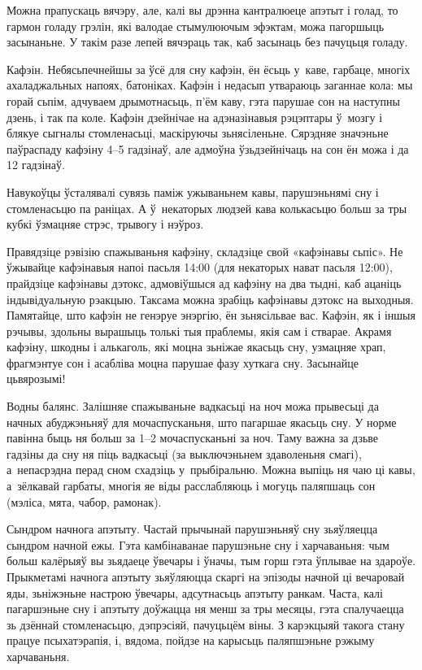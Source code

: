Можна прапускаць вячэру, але, калі вы дрэнна кантралюеце апэтыт і голад, то гармон голаду грэлін, які валодае стымулюючым эфэктам, можа пагоршыць засынаньне. У такім разе лепей вячэраць так, каб засынаць без пачуцьця голаду.

Кафэін. Небясьпечнейшы за ўсё для сну кафэін, ён ёсьць у~каве, гарбаце, многіх ахаладжальных напоях, батоніках. Кафэін і недасып утвараюць заганнае кола: мы горай сьпім, адчуваем дрымотнасьць, п'ём каву, гэта парушае сон на наступны дзень, і так па коле. Кафэін дзейнічае на адэназінавыя рэцэптары ў~мозгу і блякуе сыгналы стомленасьці, маскіруючы зьнясіленьне. Сярэдняе значэньне паўраспаду кафэіну 4--5 гадзінаў, але адмоўна ўзьдзейнічаць на сон ён можа і да 12 гадзінаў.

Навукоўцы ўсталявалі сувязь паміж ужываньнем кавы, парушэньнямі сну і стомленасьцю па раніцах. А ў~некаторых людзей кава колькасьцю больш за тры кубкі ўзмацняе стрэс, трывогу і нэўроз.

Правядзіце рэвізію спажываньня кафэіну, складзіце свой «кафэінавы сьпіс». Не ўжывайце кафэінавыя напоі пасьля 14:00 (для некаторых нават пасьля 12:00), прайдзіце кафэінавы дэтокс, адмовіўшыся ад кафэіну на два тыдні, каб ацаніць індывідуальную рэакцыю. Таксама можна зрабіць кафэінавы дэтокс на выходныя. Памятайце, што кафэін не генэруе энэргію, ён зьнясільвае вас. Кафэін, як і іншыя рэчывы, здольны вырашыць толькі тыя праблемы, якія сам і стварае. Акрамя кафэіну, шкодны і алькаголь, які моцна зьніжае якасьць сну, узмацняе храп, фрагмэнтуе сон і асабліва моцна парушае фазу хуткага сну. Засынайце цьвярозымі!

Водны балянс. Залішняе спажываньне вадкасьці на ноч можа прывесьці да начных абуджэньняў для мочаспусканьня, што пагаршае якасьць сну. У норме павінна быць ня больш за 1--2 мочаспусканьні за ноч. Таму важна за дзьве гадзіны да сну ня піць вадкасьці (за выключэньнем здаволеньня смагі), а~непасрэдна перад сном схадзіць у~прыбіральню. Можна выпіць ня чаю ці кавы, а~зёлкавай гарбаты, многія яе віды расслабляюць і могуць паляпшаць сон (мэліса, мята, чабор, рамонак).

Сындром начнога апэтыту. Частай прычынай парушэньняў сну зьяўляецца сындром начной ежы. Гэта камбінаванае парушэньне сну і харчаваньня: чым больш калёрыяў вы зьядаеце ўвечары і ўначы, тым горш гэта ўплывае на здароўе. Прыкметамі начнога апэтыту зьяўляюцца скаргі на эпізоды начной ці вечаровай яды, зьніжэньне настрою ўвечары, адсутнасьць апэтыту ранкам. Часта, калі пагаршэньне сну і апэтыту доўжацца ня менш за тры месяцы, гэта спалучаецца зь дзённай стомленасьцю, дэпрэсіяй, пачуцьцём віны. З карэкцыяй такога стану працуе псыхатэрапія, і, вядома, пойдзе на карысьць паляпшэньне рэжыму харчаваньня.

